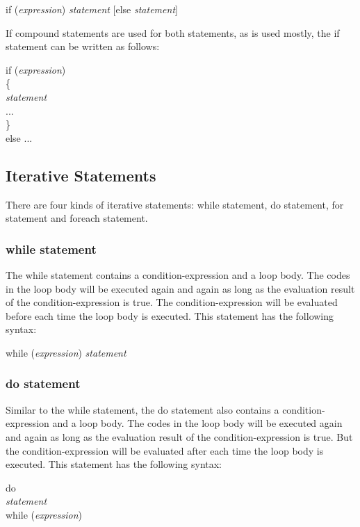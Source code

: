 \documentclass[12pt,psfig,a4]{article}
\begin{document}
\begin{code}
if (\textit{expression}) \textit{statement} [else \textit{statement}]
\end{code}

\noindent
If compound statements are used for both statements, as is used mostly, the if statement can be written as follows:

\begin{code}
if (\textit{expression}) \\
\{ \\
\textit{statement} \\
... \\
\} \\
else ...
\end{code}

\subsection{Iterative Statements}
There are four kinds of iterative statements: while statement, do statement, for statement and foreach statement.

\subsubsection{while statement}
The while statement contains a condition-expression and a loop body. The codes in the loop body will be executed again and again as long as the evaluation result of the condition-expression is true. The condition-expression will be evaluated before each time the loop body is executed. This statement has the following syntax:

\begin{code}
while (\textit{expression}) \textit{statement}
\end{code}

\subsubsection{do statement}
Similar to the while statement, the do statement also contains a condition-expression and a loop body. The codes in the loop body will be executed again and again as long as the evaluation result of the condition-expression is true. But the condition-expression will be evaluated after each time the loop body is executed. This statement has the following syntax:

\begin{code}
\begin{tabbing}
do \= \\
\> \textit{statement} \\
while (\textit{expression})
\end{tabbing}
\end{code}
\end{document}
